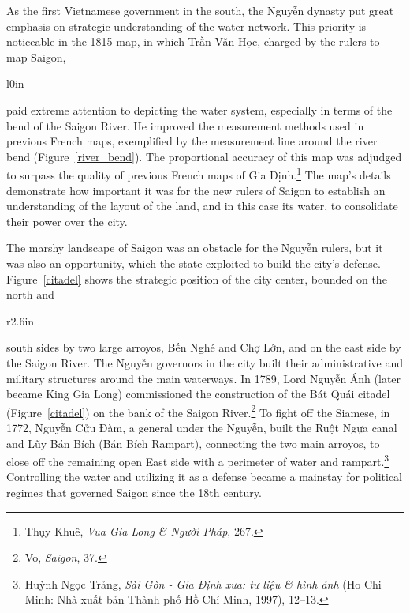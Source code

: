 As the first Vietnamese government in the south, the \vi Nguyễn dynasty put great emphasis on strategic understanding of the water network. This priority is noticeable in the 1815 map, in which \vi Trần Văn Học, charged by the rulers to map Saigon, 
 \en
\begin{wrapfigure}{l}{0in}
\vspace{-.2 in}
\caption{The bend of the Saigon River depicted by \vi Trần Văn Học (Image cropped from map by Trần Văn Học.) }
\label{river_bend}
\end{wrapfigure}
 \vi paid extreme attention to depicting the water system, especially in terms of the bend of the Saigon River. He improved the measurement methods used in previous French maps, exemplified by the measurement line around the river bend (Figure~\ref{river_bend}). The proportional accuracy of this map was adjudged to surpass the quality of previous French maps of Gia Định.\footnote{Thụy Khuê, \textit{Vua Gia Long \& Người Pháp}, 267.} The map’s details demonstrate how important it was for the new rulers of Saigon to establish an understanding of the layout of the land, and in this case its water, to consolidate their power over the city.

The marshy landscape of Saigon was an obstacle for the \vi Nguyễn rulers, but it was also an opportunity, which the state exploited to build the city’s defense. Figure~\ref{citadel} shows the strategic position of the city center, bounded on the north and 
\en
\begin{wrapfigure}{r}{2.6in}
\vspace{-.1 in}
\caption[The Bát Quái citadel]{The \vi Bát Quái citadel (Image cropped from map by Trần Văn Học.)}
\label{citadel}
\vspace{-.3 in}
\end{wrapfigure}
south sides by two large arroyos, \vi Bến Nghé and Chợ Lớn, and on the east side by the Saigon River. The \vi Nguyễn governors in the city built their administrative and military structures around the main waterways. In 1789, Lord \vi Nguyễn Ánh (later became King Gia Long) commissioned the construction of the Bát Quái citadel (Figure~\ref{citadel}) on the bank of the Saigon River.\footnote{Vo, \textit{Saigon}, 37.} To fight off the Siamese, in 1772, Nguyễn Cửu Đàm, a general under the Nguyễn, built the Ruột Ngựa canal and Lũy Bán Bích (Bán Bích Rampart), connecting the two main arroyos, to close off the remaining open East side with a perimeter of water and rampart.\footnote{Huỳnh Ngọc Trảng, \textit{Sài Gòn - Gia Định xưa: tư liệu \& hình ảnh} (Ho Chi Minh: Nhà xuất bản Thành phố Hồ Chí Minh, 1997), 12–13.} Controlling the water and utilizing it as a defense became a mainstay for political regimes that governed Saigon since the 18th century.

